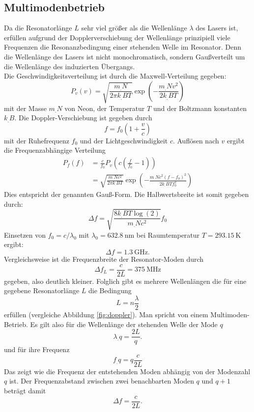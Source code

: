 \subsection{Multimodenbetrieb}
Da die Resonatorlänge $L$ sehr viel größer als die Wellenlänge $\lambda$ des Lasers ist, erfüllen aufgrund der Dopplerverschiebung der Wellenlänge prinzipiell viele Frequenzen die Resonanzbedingung einer stehenden Welle im Resonator.
Denn die Wellenlänge des Lasers ist nicht monochromatisch, sondern Gaußverteilt um die Wellenlänge des induzierten Übergangs. \\
Die Geschwindigkeitsverteilung ist durch die Maxwell-Verteilung gegeben:
\[
P_v(v)=\sqrt{\frac{m_.N}{2\pi k_.BT}}\exp\left(-\frac{m_.Nv^2}{2k_.BT}\right)
\]
mit der Masse $m_.N$ von Neon, der Temperatur $T$ und der Boltzmann konstanten $k_.B$.
Die Doppler-Verschiebung ist gegeben durch 
\[
f = f_0\left(1+\frac{v}{c}\right)
\]
mit der Ruhefrequenz $f_0$ und der Lichtgeschwindigkeit $c$.
Auflösen nach $v$ ergibt die Frequenzabhängige Verteilung
\begin{align*}
P_f(f)&=\frac{c}{f_0}P_v\left(c\left(\frac{f}{f_0}-1\right)\right)\\
	&= \sqrt{\frac{m_.Nc^2}{2\pi k_.BT}}\exp\left(-\frac{m_.Nc^2(f-f_0)^2}{2k_.BTf_0^2}\right)
\end{align*}
Dies entspricht der genannten Gauß-Form.
Die Halbwertsbreite ist somit gegeben durch:
\[
\Delta f = \sqrt{\frac{8k_.BT\log(2)}{m_.Nc^2}}f_0
\]
Einsetzen von $f_0=c/\lambda_0$ mit $\lambda_0=\SI{632.8}{\nano\metre}$ bei Raumtemperatur $T=\SI{293.15}{\kelvin}$ ergibt:
\[
\Delta f = \SI{1.3}{\giga\hertz}\text{.}
\]
Vergleichsweise ist die Frequenzbreite der Resonator-Moden durch
\[
\Delta f_L = \frac{c}{2L} = \SI{375}{\mega\hertz}
\]
gegeben, also deutlich kleiner.
Folglich gibt es mehrere Wellenlängen die für eine gegebene Resonatorlänge $L$ die Bedingung 
\[
L = n\frac{\lambda}{2}
\]
erfüllen (vergleiche Abbildung \ref{fig:doppler}). Man spricht von einem Multimoden-Betrieb. 
Es gilt also für die Wellenlänge der stehenden Welle der Mode $q$
\[
\lambda_.q = \frac{2L}{q}\text{.}
\]
und für ihre Frequenz
\[
f_.q = q\frac{c}{2L}
\]
Das zeigt wie die Frequenz der entstehenden Moden abhängig von der Modenzahl $q$ ist. 
Der Frequenzabstand zwischen zwei benachbarten Moden $q$ und $q+1$ beträgt damit
\[
\Delta f = \frac{c}{2L}\text{.}
\]

